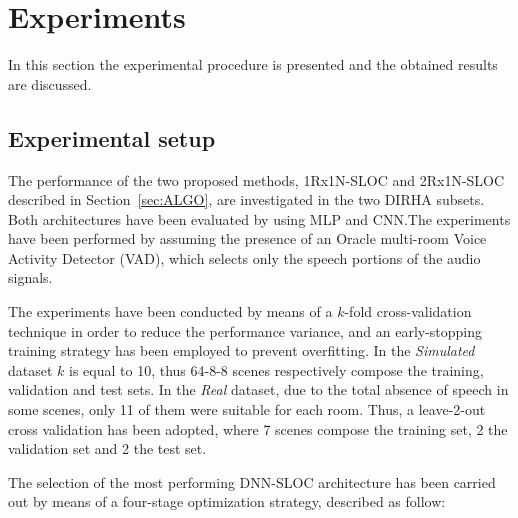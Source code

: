 \documentclass[review]{elsarticle}
\newcommand{\secref}[1]{Section~\ref{#1}}
\begin{document}
\section{Experiments}
\label{sec:expRes}
In this section the experimental procedure is presented and the obtained results are discussed. 

\subsection{Experimental setup}
The performance of the two proposed methods, 1Rx1N-SLOC and 2Rx1N-SLOC described in \secref{sec:ALGO}, are investigated in the two DIRHA subsets.
Both architectures have been evaluated by using MLP and CNN.The experiments have been performed by assuming the presence of an Oracle multi-room Voice Activity Detector (VAD), which selects only the speech portions of the audio signals.

The experiments have been conducted by means of a $k$-fold cross-validation technique in order to reduce the performance variance, and an early-stopping training strategy has been employed to prevent overfitting. In the \textit{Simulated} dataset $k$ is equal to 10, thus 64-8-8 scenes respectively compose the training, validation and test sets. In the \textit{Real} dataset, due to the total absence of speech in some scenes, only 11 of them were suitable for each room. Thus, a leave-2-out cross validation has been adopted, where 7 scenes compose the training set, 2 the validation set and 2 the test set.

The selection of the most performing DNN-SLOC architecture has been carried out by means of a four-stage optimization strategy, described as follow:
\end{document}
